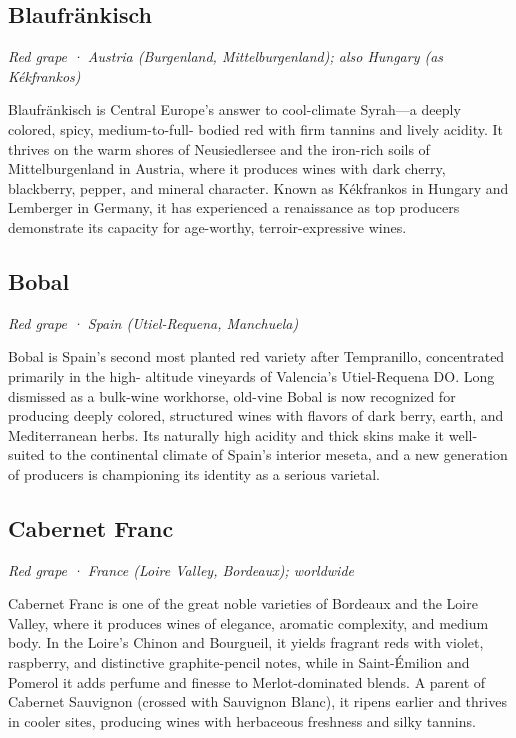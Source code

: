 \subsection*{Blaufränkisch}
\textit{Red grape · Austria (Burgenland, Mittelburgenland); also Hungary (as Kékfrankos)}\par\smallskip

Blaufränkisch is Central Europe’s answer to cool-climate Syrah—a deeply colored, spicy, medium-to-full- bodied red with firm tannins and lively acidity. It thrives on the warm shores of Neusiedlersee and the iron-rich soils of Mittelburgenland in Austria, where it produces wines with dark cherry, blackberry, pepper, and mineral character. Known as Kékfrankos in Hungary and Lemberger in Germany, it has experienced a renaissance as top producers demonstrate its capacity for age-worthy, terroir-expressive wines.

\subsection*{Bobal}
\textit{Red grape · Spain (Utiel-Requena, Manchuela)}\par\smallskip

Bobal is Spain’s second most planted red variety after Tempranillo, concentrated primarily in the high- altitude vineyards of Valencia’s Utiel-Requena DO. Long dismissed as a bulk-wine workhorse, old-vine Bobal is now recognized for producing deeply colored, structured wines with flavors of dark berry, earth, and Mediterranean herbs. Its naturally high acidity and thick skins make it well-suited to the continental climate of Spain’s interior meseta, and a new generation of producers is championing its identity as a serious varietal.

\subsection*{Cabernet Franc}
\textit{Red grape · France (Loire Valley, Bordeaux); worldwide}\par\smallskip

Cabernet Franc is one of the great noble varieties of Bordeaux and the Loire Valley, where it produces wines of elegance, aromatic complexity, and medium body. In the Loire’s Chinon and Bourgueil, it yields fragrant reds with violet, raspberry, and distinctive graphite-pencil notes, while in Saint-Émilion and Pomerol it adds perfume and finesse to Merlot-dominated blends. A parent of Cabernet Sauvignon (crossed with Sauvignon Blanc), it ripens earlier and thrives in cooler sites, producing wines with herbaceous freshness and silky tannins.

